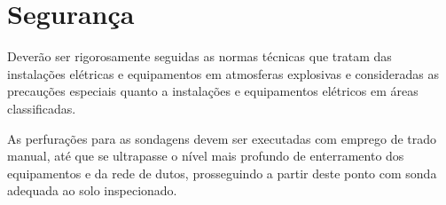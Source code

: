 \section{Segurança}

Deverão ser rigorosamente seguidas as normas técnicas que 
tratam das instalações elétricas e equipamentos em 
atmosferas explosivas e consideradas as precauções 
especiais quanto a instalações e equipamentos elétricos em 
áreas classificadas.

As perfurações para as sondagens devem ser executadas com 
emprego de trado manual, até que se ultrapasse o nível mais 
profundo de enterramento dos equipamentos e da rede de 
dutos, prosseguindo a partir deste ponto com sonda adequada 
ao solo inspecionado.

